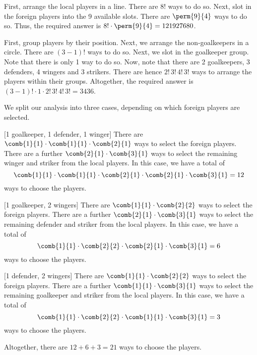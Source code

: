 \begin{solution}
    \begin{ppart}
        First, arrange the local players in a line. There are $8!$ ways to do so. Next, slot in the foreign players into the 9 available slots. There are $\perm{9}{4}$ ways to do so. Thus, the required answer is $8! \cdot \perm{9}{4} = 121927680$.
    \end{ppart}
    \begin{ppart}
        First, group players by their position. Next, we arrange the non-goalkeepers in a circle. There are $(3-1)!$ ways to do so. Next, we slot in the goalkeeper group. Note that there is only 1 way to do so. Now, note that there are 2 goalkeepers, 3 defenders, 4 wingers and 3 strikers. There are hence $2! \, 3! \, 4! \, 3!$ ways to arrange the players within their groups. Altogether, the required answer is $(3-1)! \cdot 1 \cdot 2! \, 3! \, 4! \, 3! = 3436$.
    \end{ppart}
    \begin{ppart}
        We split our analysis into three cases, depending on which foreign players are selected.

        [1 goalkeeper, 1 defender, 1 winger] There are $\comb{1}{1} \cdot \comb{1}{1} \cdot \comb{2}{1}$ ways to select the foreign players. There are a further $\comb{2}{1} \cdot \comb{3}{1}$ ways to select the remaining winger and striker from the local players. In this case, we have a total of \[\comb{1}{1} \cdot \comb{1}{1} \cdot \comb{2}{1} \cdot \comb{2}{1} \cdot \comb{3}{1} = 12\] ways to choose the players.

        [1 goalkeeper, 2 wingers] There are $\comb{1}{1} \cdot \comb{2}{2}$ ways to select the foreign players. There are a further $\comb{2}{1} \cdot \comb{3}{1}$ ways to select the remaining defender and striker from the local players. In this case, we have a total of \[\comb{1}{1} \cdot \comb{2}{2} \cdot \comb{2}{1} \cdot \comb{3}{1} = 6\] ways to choose the players.

        [1 defender, 2 wingers] There are $\comb{1}{1} \cdot \comb{2}{2}$ ways to select the foreign players. There are a further $\comb{1}{1} \cdot \comb{3}{1}$ ways to select the remaining goalkeeper and striker from the local players. In this case, we have a total of \[\comb{1}{1} \cdot \comb{2}{2} \cdot \comb{1}{1} \cdot \comb{3}{1} = 3\] ways to choose the players.

        Altogether, there are $12 + 6 + 3 = 21$ ways to choose the players.
    \end{ppart}
\end{solution}

